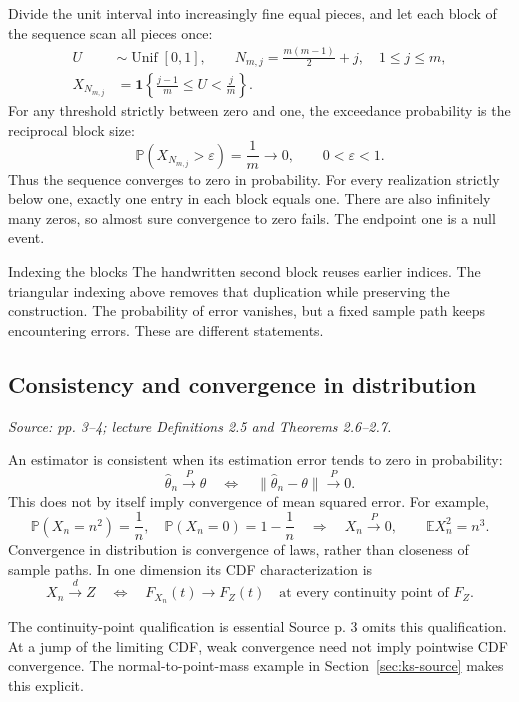 \documentclass[12pt]{article}
\newcommand{\E}{\mathbb E}
\newcommand{\Prob}{\mathbb P}
\newcommand{\ind}{\mathbf 1}
\begin{document}
Divide the unit interval into increasingly fine equal pieces, and let each
block of the sequence scan all pieces once:
\begin{align}
 U&\sim\operatorname{Unif}[0,1],\qquad
 N_{m,j}=\frac{m(m-1)}2+j,\quad 1\le j\le m,\\
 X_{N_{m,j}}&=\ind\!\left\{\frac{j-1}{m}\le U<\frac jm\right\}.
\end{align}
For any threshold strictly between zero and one, the exceedance probability
is the reciprocal block size:
\begin{equation}
 \Prob(X_{N_{m,j}}>\varepsilon)=\frac1m\longrightarrow0,
 \qquad 0<\varepsilon<1.
\end{equation}
Thus the sequence converges to zero in probability. For every realization
strictly below one, exactly one entry in each block equals one. There are
also infinitely many zeros, so almost sure convergence to zero fails.
The endpoint one is a null event.
\begin{correctionbox}{Indexing the blocks}
The handwritten second block reuses earlier indices. The triangular
indexing above removes that duplication while preserving the construction.
The probability of error vanishes, but a fixed sample path keeps encountering
errors. These are different statements.
\end{correctionbox}

\subsection{Consistency and convergence in distribution}
\textit{Source: pp. 3--4; lecture Definitions 2.5 and Theorems 2.6--2.7.}

An estimator is consistent when its estimation error tends to zero in
probability:
\begin{equation}
 \widehat\theta_n\xrightarrow{P}\theta
 \quad\Longleftrightarrow\quad
 \|\widehat\theta_n-\theta\|\xrightarrow{P}0.
\end{equation}
This does not by itself imply convergence of mean squared error. For example,
\begin{equation}
 \Prob(X_n=n^2)=\frac1n,\quad\Prob(X_n=0)=1-\frac1n
 \quad\Longrightarrow\quad
 X_n\xrightarrow{P}0,\qquad \E X_n^2=n^3.
\end{equation}
Convergence in distribution is convergence of laws, rather than closeness
of sample paths. In one dimension its CDF characterization is
\begin{equation}
 X_n\xrightarrow{d}Z
 \quad\Longleftrightarrow\quad
 F_{X_n}(t)\longrightarrow F_Z(t)
 \quad\text{at every continuity point of }F_Z.
\end{equation}
\begin{correctionbox}{The continuity-point qualification is essential}
Source p. 3 omits this qualification. At a jump of the limiting CDF, weak
convergence need not imply pointwise CDF convergence. The normal-to-point-mass
example in Section~\ref{sec:ks-source} makes this explicit.
\end{correctionbox}
\end{document}
